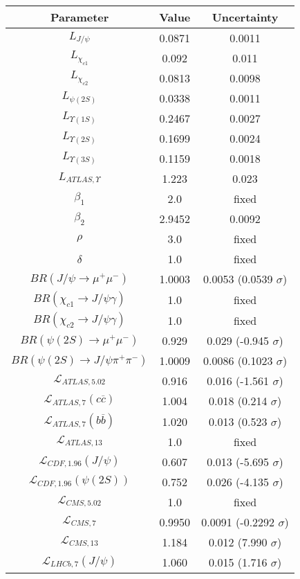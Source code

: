 \begin{table}[h!]
\centering
\begin{tabular}{c|c|c}
Parameter & Value & Uncertainty \\
\hline
$L_{J/\psi}$ & 0.0871 & 0.0011 \\
$L_{\chi_{c1}}$ & 0.092 & 0.011 \\
$L_{\chi_{c2}}$ & 0.0813 & 0.0098 \\
$L_{\psi(2S)}$ & 0.0338 & 0.0011 \\
$L_{\Upsilon(1S)}$ & 0.2467 & 0.0027 \\
$L_{\Upsilon(2S)}$ & 0.1699 & 0.0024 \\
$L_{\Upsilon(3S)}$ & 0.1159 & 0.0018 \\
$L_{ATLAS,\Upsilon}$ & 1.223 & 0.023 \\
$\beta_1$ & 2.0 & fixed \\
$\beta_2$ & 2.9452 & 0.0092 \\
$\rho$ & 3.0 & fixed \\
$\delta$ & 1.0 & fixed \\
$BR(J/\psi\rightarrow\mu^+\mu^-)$ & 1.0003 & 0.0053 (0.0539 $\sigma$) \\
$BR(\chi_{c1}\rightarrow J/\psi\gamma)$ & 1.0 & fixed \\
$BR(\chi_{c2}\rightarrow J/\psi\gamma)$ & 1.0 & fixed \\
$BR(\psi(2S)\rightarrow\mu^+\mu^-)$ & 0.929 & 0.029 (-0.945 $\sigma$) \\
$BR(\psi(2S)\rightarrow J/\psi\pi^+\pi^-)$ & 1.0009 & 0.0086 (0.1023 $\sigma$) \\
$\mathcal L_{ATLAS,5.02}$ & 0.916 & 0.016 (-1.561 $\sigma$) \\
$\mathcal L_{ATLAS,7}(c\overline c)$ & 1.004 & 0.018 (0.214 $\sigma$) \\
$\mathcal L_{ATLAS,7}(b\overline b)$ & 1.020 & 0.013 (0.523 $\sigma$) \\
$\mathcal L_{ATLAS,13}$ & 1.0 & fixed \\
$\mathcal L_{CDF,1.96}(J/\psi)$ & 0.607 & 0.013 (-5.695 $\sigma$) \\
$\mathcal L_{CDF,1.96}(\psi(2S))$ & 0.752 & 0.026 (-4.135 $\sigma$) \\
$\mathcal L_{CMS,5.02}$ & 1.0 & fixed \\
$\mathcal L_{CMS,7}$ & 0.9950 & 0.0091 (-0.2292 $\sigma$) \\
$\mathcal L_{CMS,13}$ & 1.184 & 0.012 (7.990 $\sigma$) \\
$\mathcal L_{LHCb,7}(J/\psi)$ & 1.060 & 0.015 (1.716 $\sigma$) \\

\end{tabular}
\end{table}
